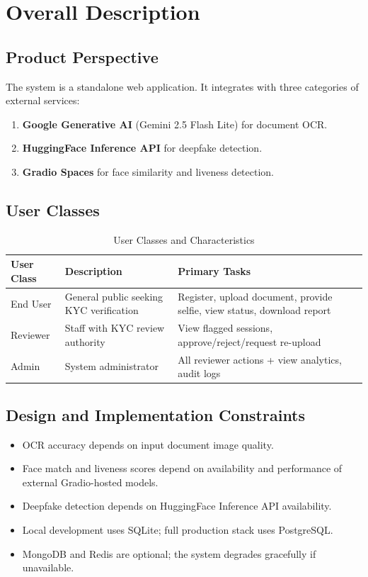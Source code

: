\documentclass[12pt,a4paper]{report}
\begin{document}
\section{Overall Description}

\subsection{Product Perspective}
The system is a standalone web application. It integrates with three categories of external services:
\begin{enumerate}
    \item \textbf{Google Generative AI} (Gemini 2.5 Flash Lite) for document OCR.
    \item \textbf{HuggingFace Inference API} for deepfake detection.
    \item \textbf{Gradio Spaces} for face similarity and liveness detection.
\end{enumerate}

\subsection{User Classes}

\begin{table}[H]
\centering
\caption{User Classes and Characteristics}
\begin{tabular}{@{}p{2.5cm}p{4cm}p{5cm}@{}}
\toprule
\textbf{User Class} & \textbf{Description} & \textbf{Primary Tasks} \\
\midrule
End User & General public seeking KYC verification & Register, upload document, provide selfie, view status, download report \\
Reviewer & Staff with KYC review authority & View flagged sessions, approve/reject/request re-upload \\
Admin & System administrator & All reviewer actions + view analytics, audit logs \\
\bottomrule
\end{tabular}
\end{table}

\subsection{Design and Implementation Constraints}
\begin{itemize}
    \item OCR accuracy depends on input document image quality.
    \item Face match and liveness scores depend on availability and performance of external Gradio-hosted models.
    \item Deepfake detection depends on HuggingFace Inference API availability.
    \item Local development uses SQLite; full production stack uses PostgreSQL.
    \item MongoDB and Redis are optional; the system degrades gracefully if unavailable.
\end{itemize}
\end{document}
